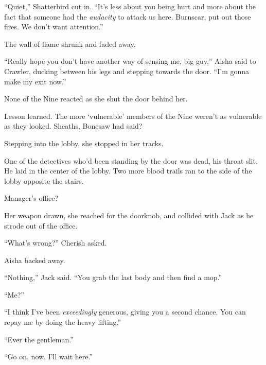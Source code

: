``Quiet,'' Shatterbird cut in.  ``It's less about you being hurt and more about the fact that someone had the \emph{audacity} to attack us here.  Burnscar, put out those fires.  We don't want attention.''



The wall of flame shrunk and faded away.



``Really hope you don't have another way of sensing me, big guy,'' Aisha said to Crawler, ducking between his legs and stepping towards the door.  ``I'm gonna make my exit now.''



None of the Nine reacted as she shut the door behind her.



Lesson learned.  The more `vulnerable' members of the Nine weren't as vulnerable as they looked.  Sheaths, Bonesaw had said?



Stepping into the lobby, she stopped in her tracks.



One of the detectives who'd been standing by the door was dead, his throat slit.  He laid in the center of the lobby.  Two more blood trails ran to the side of the lobby opposite the stairs.



Manager's office?



Her weapon drawn, she reached for the doorknob, and collided with Jack as he strode out of the office.



``What's wrong?'' Cherish asked.



Aisha backed away.



``Nothing,'' Jack said.  ``You grab the last body and then find a mop.''



``Me?''



``I think I've been \emph{exceedingly} generous, giving you a second chance.  You can repay me by doing the heavy lifting.''



``Ever the gentleman.''



``Go on, now.  I'll wait here.''



